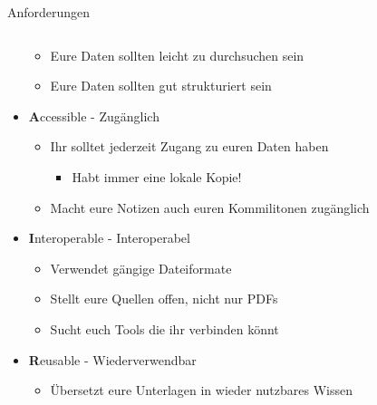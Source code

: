 \begin{frame}{Anforderungen}
\begin{columns}[t]
\begin{column}[t]{0.84\textwidth}
\begin{itemize}
                \begin{itemize}
                    \item Eure Daten sollten leicht zu durchsuchen sein
                    \item Eure Daten sollten gut strukturiert sein
                \end{itemize}
                \item[] \textbf{A}ccessible - Zugänglich
                \begin{itemize}
                    \item Ihr solltet jederzeit Zugang zu euren Daten haben
                    \begin{itemize}
                        \item Habt immer eine lokale Kopie!
                    \end{itemize}
                \item Macht eure Notizen auch euren Kommilitonen zugänglich
            \end{itemize}
                \item[] \textbf{I}nteroperable - Interoperabel
                \begin{itemize}
                    \item Verwendet gängige Dateiformate
                    \item Stellt eure Quellen offen, nicht nur PDFs
                    \item Sucht euch Tools die ihr verbinden könnt
                \end{itemize}
                \item[] \textbf{R}eusable - Wiederverwendbar
                \begin{itemize}
                    \item Übersetzt eure Unterlagen in wieder nutzbares Wissen
                \end{itemize}
            \end{itemize}
        \end{column}
    \end{columns}  
\end{frame}

